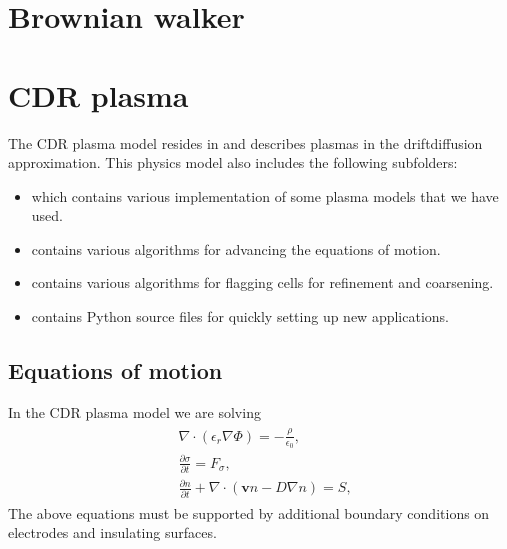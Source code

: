 \documentclass[letterpaper,10pt,english]{sphinxmanual}
\begin{document}
\section{Brownian walker}
\label{\detokenize{Applications/BrownianWalkerModel:brownian-walker}}\label{\detokenize{Applications/BrownianWalkerModel:chap-brownianwalkermodel}}\label{\detokenize{Applications/BrownianWalkerModel::doc}}

\section{CDR plasma}
\label{\detokenize{Applications/CdrPlasmaModel:cdr-plasma}}\label{\detokenize{Applications/CdrPlasmaModel:chap-cdrplasmamodel}}\label{\detokenize{Applications/CdrPlasmaModel::doc}}
The CDR plasma model resides in  and describes plasmas in the drift\sphinxhyphen{}diffusion approximation.
This physics model also includes the following subfolders:
\begin{itemize}
\item {} 
 which contains various implementation of some plasma models that we have used.

\item {} 
 contains various algorithms for advancing the equations of motion.

\item {} 
 contains various algorithms for flagging cells for refinement and coarsening.

\item {} 
 contains Python source files for quickly setting up new applications.

\end{itemize}


\subsection{Equations of motion}
\label{\detokenize{Applications/CdrPlasmaModel:equations-of-motion}}
In the CDR plasma model we are solving
\begin{equation}\label{equation:Applications/CdrPlasmaModel:CdrPlasmaEquations}
\begin{split}\begin{align}
&\nabla\cdot\left(\epsilon_r\nabla\Phi\right) = -\frac{\rho}{\epsilon_0}, \\[1ex]
&\frac{\partial\sigma}{\partial t} = F_\sigma,\\[1ex]
&\frac{\partial n}{\partial t} + \nabla\cdot\left(\mathbf{v} n - D\nabla n\right) = S,
\end{align}\end{split}
\end{equation}
The above equations must be supported by additional boundary conditions on electrodes and insulating surfaces.
\end{document}

